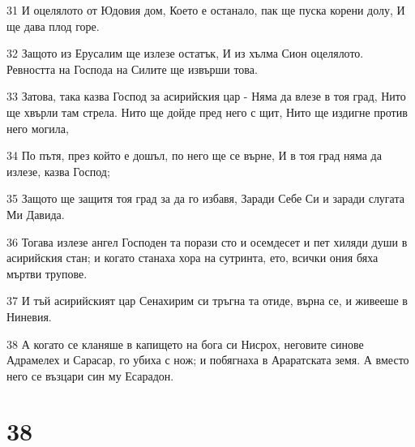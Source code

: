\par 31 И оцелялото от Юдовия дом, Което е останало, пак ще пуска корени долу, И ще дава плод горе.
\par 32 Защото из Ерусалим ще излезе остатък, И из хълма Сион оцелялото. Ревността на Господа на Силите ще извърши това.
\par 33 Затова, така казва Господ за асирийския цар - Няма да влезе в тоя град, Нито ще хвърли там стрела. Нито ще дойде пред него с щит, Нито ще издигне против него могила,
\par 34 По пътя, през който е дошъл, по него ще се върне, И в тоя град няма да излезе, казва Господ;
\par 35 Защото ще защитя тоя град за да го избавя, Заради Себе Си и заради слугата Ми Давида.
\par 36 Тогава излезе ангел Господен та порази сто и осемдесет и пет хиляди души в асирийския стан; и когато станаха хора на сутринта, ето, всички ония бяха мъртви трупове.
\par 37 И тъй асирийският цар Сенахирим си тръгна та отиде, върна се, и живееше в Ниневия.
\par 38 А когато се кланяше в капището на бога си Нисрох, неговите синове Адрамелех и Сарасар, го убиха с нож; и побягнаха в Араратската земя. А вместо него се възцари син му Есарадон.

\chapter{38}

